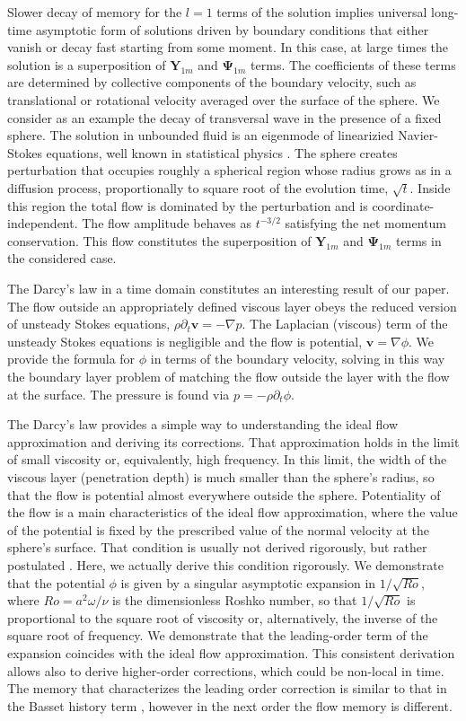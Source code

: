 \documentclass[aps,prx,twocolumn,amsmath,amssymb,amsfonts]{revtex4-2}
\begin{document}
{{Slower decay of memory for the $l=1$ terms of the solution implies universal long-time asymptotic form of solutions driven by boundary conditions that either vanish or decay fast starting from some moment. In this case, at large times the solution is a superposition of $\bm Y_{1m}$ and $\bm \Psi_{1m}$ terms. The coefficients of these terms are determined by collective components of the boundary velocity, such as translational or rotational velocity averaged over the surface of the sphere. We consider as an example the decay of transversal wave in the presence of a fixed sphere. The solution in unbounded fluid is an eigenmode of linearizied Navier-Stokes equations, well known in statistical physics \cite{reichl}. The sphere creates perturbation that occupies roughly a spherical region whose radius grows as in a diffusion process, proportionally to square root of the evolution time, $\sqrt{t}$. Inside this region the total flow is dominated by the perturbation and is coordinate-independent. The flow amplitude behaves as $t^{-3/2}$ satisfying the net momentum conservation. This flow constitutes the superposition of $\bm Y_{1m}$ and $\bm \Psi_{1m}$ terms in the considered case.

The Darcy's law in a time domain constitutes an interesting result of our paper. The flow outside an appropriately defined viscous layer obeys the reduced version of unsteady Stokes equations, $\rho \partial_t\bm v=-\nabla p$. The Laplacian (viscous) term of the unsteady Stokes equations is negligible and the flow is potential, $\bm v=\nabla\phi$. We provide the formula for $\phi$ in terms of the boundary velocity, solving in this way the boundary layer problem of matching the flow outside the layer with the flow at the surface. The pressure is found via $p=-\rho\partial_t\phi$.

The Darcy's law provides a simple way to understanding the ideal flow approximation and deriving its corrections. That approximation holds in the limit of small viscosity or, equivalently, high frequency. In this limit, the width of the viscous layer (penetration depth) is much smaller than the sphere's radius, so that the flow is potential almost everywhere outside the sphere. Potentiality of the flow is a main characteristics of the ideal flow approximation, where the value of the potential is fixed by the prescribed value of the normal velocity at the sphere's surface. That condition is usually not derived rigorously, but rather postulated \cite{LL,bat}. Here, we actually derive this condition rigorously. We demonstrate that the potential $\phi$ is given by a singular asymptotic expansion in $1/\sqrt{Ro}$, where $Ro=a^2\omega/\nu$ is the dimensionless Roshko number, so that $1/\sqrt{Ro}$ is proportional to the square root of viscosity or, alternatively, the inverse of the square root of frequency.
We demonstrate that the leading-order term of the expansion coincides with the ideal flow approximation. This consistent derivation allows also to derive higher-order corrections, which could be non-local in time. The memory that characterizes the leading order correction is similar to that in the Basset history term \cite{kim}, however in the next order the flow memory is different.

}}
\end{document}
